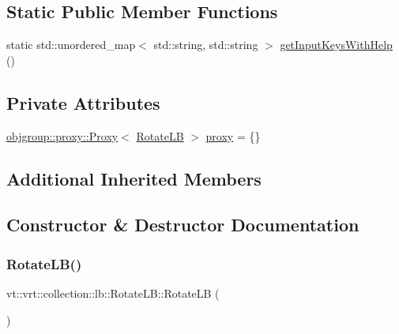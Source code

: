 \subsection*{Static Public Member Functions}
\begin{DoxyCompactItemize}
\item 
static std\+::unordered\+\_\+map$<$ std\+::string, std\+::string $>$ \hyperlink{structvt_1_1vrt_1_1collection_1_1lb_1_1_rotate_l_b_ae740582c6162bb2490c28d4bfb45d763}{get\+Input\+Keys\+With\+Help} ()
\end{DoxyCompactItemize}
\subsection*{Private Attributes}
\begin{DoxyCompactItemize}
\item 
\hyperlink{structvt_1_1objgroup_1_1proxy_1_1_proxy}{objgroup\+::proxy\+::\+Proxy}$<$ \hyperlink{structvt_1_1vrt_1_1collection_1_1lb_1_1_rotate_l_b}{Rotate\+LB} $>$ \hyperlink{structvt_1_1vrt_1_1collection_1_1lb_1_1_rotate_l_b_aa181cbc42ae451bee43dacdddd708560}{proxy} = \{\}
\end{DoxyCompactItemize}
\subsection*{Additional Inherited Members}


\subsection{Constructor \& Destructor Documentation}
\mbox{\label{structvt_1_1vrt_1_1collection_1_1lb_1_1_rotate_l_b_a9cb675c68ec8794d6a2e284ece5de8a8}} 
\subsubsection{\texorpdfstring{Rotate\+L\+B()}{RotateLB()}}
{\footnotesize\ttfamily vt\+::vrt\+::collection\+::lb\+::\+Rotate\+L\+B\+::\+Rotate\+LB (\begin{DoxyParamCaption}{ }\end{DoxyParamCaption})\hspace{0.3cm}{\ttfamily [default]}}

